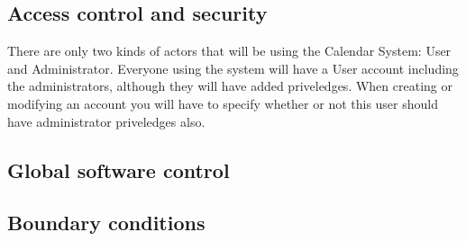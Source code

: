 \subsection{Access control and security}
There are only two kinds of actors that will be using the Calendar System: User and Administrator. Everyone using the system will have a User account including the administrators, although they will have added priveledges. When creating or modifying an account you will have to specify whether or not this user should have administrator priveledges also.
\subsection{Global software control}
\subsection{Boundary conditions}